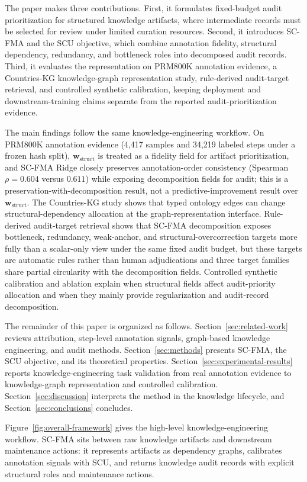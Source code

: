 \documentclass[a4paper,fleqn]{cas-sc}
\newcommand{\wstruct}{\ensuremath{\mathbf{w}_{\mathrm{struct}}}}
\begin{document}
The paper makes three contributions. First, it formulates fixed-budget audit prioritization for structured knowledge artifacts, where intermediate records must be selected for review under limited curation resources. Second, it introduces SC-FMA and the SCU objective, which combine annotation fidelity, structural dependency, redundancy, and bottleneck roles into decomposed audit records. Third, it evaluates the representation on PRM800K annotation evidence, a Countries-KG knowledge-graph representation study, rule-derived audit-target retrieval, and controlled synthetic calibration, keeping deployment and downstream-training claims separate from the reported audit-prioritization evidence.

The main findings follow the same knowledge-engineering workflow. On PRM800K annotation evidence (4,417 samples and 34,219 labeled steps under a frozen hash split), \wstruct{} is treated as a fidelity field for artifact prioritization, and SC-FMA Ridge closely preserves annotation-order consistency (Spearman $\rho = 0.604$ versus $0.611$) while exposing decomposition fields for audit; this is a preservation-with-decomposition result, not a predictive-improvement result over \wstruct{}. The Countries-KG study shows that typed ontology edges can change structural-dependency allocation at the graph-representation interface. Rule-derived audit-target retrieval shows that SC-FMA decomposition exposes bottleneck, redundancy, weak-anchor, and structural-overcorrection targets more fully than a scalar-only view under the same fixed audit budget, but these targets are automatic rules rather than human adjudications and three target families share partial circularity with the decomposition fields. Controlled synthetic calibration and ablation explain when structural fields affect audit-priority allocation and when they mainly provide regularization and audit-record decomposition.

The remainder of this paper is organized as follows. Section~\ref{sec:related-work} reviews attribution, step-level annotation signals, graph-based knowledge engineering, and audit methods. Section~\ref{sec:methods} presents SC-FMA, the SCU objective, and its theoretical properties. Section~\ref{sec:experimental-results} reports knowledge-engineering task validation from real annotation evidence to knowledge-graph representation and controlled calibration. Section~\ref{sec:discussion} interprets the method in the knowledge lifecycle, and Section~\ref{sec:conclusions} concludes.

Figure~\ref{fig:overall-framework} gives the high-level knowledge-engineering workflow. SC-FMA sits between raw knowledge artifacts and downstream maintenance actions: it represents artifacts as dependency graphs, calibrates annotation signals with SCU, and returns knowledge audit records with explicit structural roles and maintenance actions.
\end{document}

